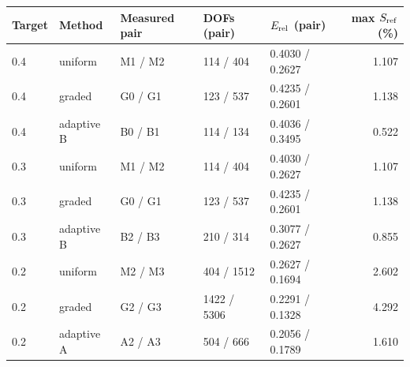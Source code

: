 \begin{tabular}{@{}lllllr@{}}
\toprule
Target & Method & Measured pair & DOFs (pair) & $E_{\rm rel}$ (pair) & max $S_{\rm ref}$ (\%)\\
\midrule
0.4 & uniform & M1 / M2 & 114 / 404 & 0.4030 / 0.2627 & 1.107\\
0.4 & graded & G0 / G1 & 123 / 537 & 0.4235 / 0.2601 & 1.138\\
0.4 & adaptive B & B0 / B1 & 114 / 134 & 0.4036 / 0.3495 & 0.522\\
0.3 & uniform & M1 / M2 & 114 / 404 & 0.4030 / 0.2627 & 1.107\\
0.3 & graded & G0 / G1 & 123 / 537 & 0.4235 / 0.2601 & 1.138\\
0.3 & adaptive B & B2 / B3 & 210 / 314 & 0.3077 / 0.2627 & 0.855\\
0.2 & uniform & M2 / M3 & 404 / 1512 & 0.2627 / 0.1694 & 2.602\\
0.2 & graded & G2 / G3 & 1422 / 5306 & 0.2291 / 0.1328 & 4.292\\
0.2 & adaptive A & A2 / A3 & 504 / 666 & 0.2056 / 0.1789 & 1.610\\
\bottomrule
\end{tabular}
